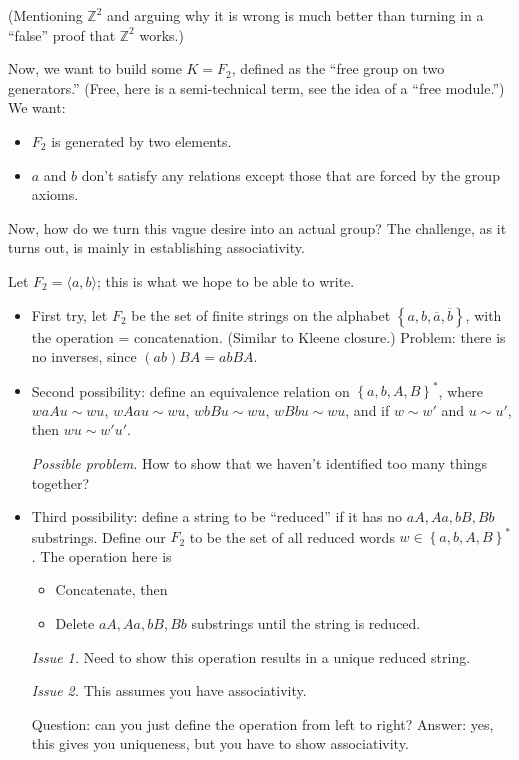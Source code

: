 \documentclass[12pt]{article}
\newcommand{\ol}{\overline}
\def\ZZ{\mathbb{Z}}
\begin{document}
  (Mentioning $\ZZ^2$ and arguing why it is wrong is much better than turning in a ``false'' proof that $\ZZ^2$ works.)

  Now, we want to build some $K = F_2$, defined as the ``free group on two generators.''  (Free, here is a semi-technical term, see the idea of a ``free module.'')  We want:

  \begin{itemize}
    \item $F_2$ is generated by two elements.
    \item $a$ and $b$ don't satisfy any relations except those that are forced by the group axioms.
  \end{itemize}

  Now, how do we turn this vague desire into an actual group?  The challenge, as it turns out, is mainly in establishing associativity.

  Let $F_2 = \langle a, b \rangle$; this is what we hope to be able to write.  
 
  \begin{itemize}
    \item First try, let $F_2$ be the set of finite strings on the alphabet $\left\{ a, b, \ol{a}, \ol{b} \right\}$, with the operation = concatenation.  (Similar to Kleene closure.)  Problem: there is no inverses, since $(ab) BA = ab BA$.
    \item Second possibility: define an equivalence relation on $\left\{ a, b, A, B \right\}^{*}$, where $waAu \sim wu$, $wAau \sim wu$, $wbBu \sim wu$, $wBbu \sim wu$, and if $w \sim w'$ and $u \sim u'$, then $wu \sim w'u'$.

      {\it Possible problem.} How to show that we haven't identified too many things together?

    \item Third possibility: define a string to be ``reduced'' if it has no $aA, Aa, bB, Bb$ substrings.  Define our $F_2$ to be the set of all reduced words $w \in \left\{ a, b, A, B \right\}^{*}$.  The operation here is 

      \begin{itemize}
        \item Concatenate, then
        \item Delete $aA, Aa, bB, Bb$ substrings until the string is reduced.
      \end{itemize}

      {\it Issue 1.} Need to show this operation results in a unique reduced string.

      {\it Issue 2.} This assumes you have associativity.

      Question: can you just define the operation from left to right?  Answer: yes, this gives you uniqueness, but you have to show associativity.
  \end{itemize}
\end{document}
